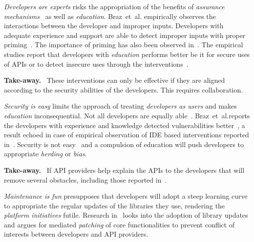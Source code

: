 \documentclass[conference]{IEEEtran}
\newenvironment{finding}{\begin{framed}\noindent\textbf{Take-away.}~}{\end{framed}}
\newcommand{\etal}[0]{et~al{.}}
\begin{document}
\emph{Developers are experts} risks the appropriation of the benefits of \emph{assurance mechanisms}~\cite{weir2020,hala2016} as well as \emph{education}. 
Braz~\etal{} empirically observes the interactions between the developer and improper inputs. Developers with adequate experience and support are able to detect improper inputs with proper priming~\cite{braz2021}. The importance of priming has also been observed in~\cite{joseph2021,thomas2018}. The empirical studies report that developers with \emph{education} performs better be it for secure uses of APIs or to detect insecure uses through the interventions~\cite{madiha2017,naiakshina2018,zhu2014}. 

\begin{finding}\noindent
These interventions can only be effective if they are aligned according to the security abilities of the developers. This requires collaboration. 
\end{finding}


\emph{Security is easy} limits the approach of treating \emph{developers as users} and makes \emph{education} inconsequential. Not all developers are equally able~\cite{zhuaside2013,braz2021}. Braz~\etal reports the developers with experience and knowledge detected vulnerabilities better~\cite{braz2021}, a result echoed in case of empirical observation of IDE based interventions reported in~\cite{aside2012}. Security is not easy~\cite{oltrogge2018rise} and a compulsion of education will push developers to appropriate \emph{herding} or \emph{bias}. 
\begin{finding}
\noindent  
If API providers help explain the APIs to the developers that will remove several obstacles, including those reported in~\cite{nadijava2016,acar2016infosources}.  
\end{finding}

\emph{Maintenance is fun} presupposes that developers will adopt a steep learning curve to appropriate the regular updates of the libraries they use, rendering the \emph{platform initiatives} futile. Research in~\cite{erikacar2017} looks into the adoption of library updates and argues for mediated \emph{patching} of core functionalities to prevent conflict of interests between developers and API providers. 
\end{document}
